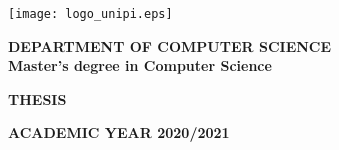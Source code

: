 \begin{titlepage}
	\begin{center}
		\texttt{[image: logo\_unipi.eps]}

		\vspace{1cm}
		\large
		\textbf{\MakeUppercase{Department of Computer Science}}\\
		\textbf{Master's degree in Computer Science}

		\vspace{3cm}
		\Large
		\textbf{\MakeUppercase{Thesis}}

		\vspace{0.5cm}
		\LARGE
		\textbf{\thesistitle}

		\vspace{3.5cm}
		\Large
		\peopleheader
		\textbf{\authornamefl} \hfill \textbf{\supervisors}        

		\vfill
		\large
		\textbf{\MakeUppercase{Academic year 2020/2021}}
    \end{center}
\end{titlepage}